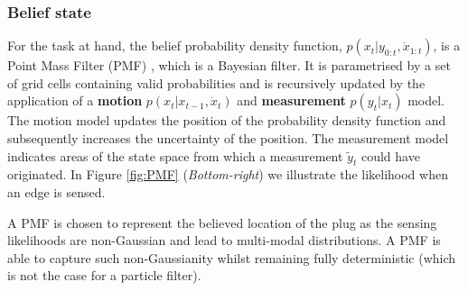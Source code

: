 \subsubsection{Belief state}
For the task at hand, the belief probability density function,  $p(x_t|y_{0:t},\dot{x}_{1:t})$,  
is a Point Mass Filter (PMF) \cite[p.87]{Bergman99recursivebayesian}, which is a  Bayesian filter.
It is parametrised by a set of grid cells containing valid probabilities 
and is recursively updated by the application of a \textbf{motion} $p(x_t|x_{t-1},\dot{x}_t)$ 
and \textbf{measurement} $p(y_t|x_t)$ model. The motion model updates the position of the probability density function 
and subsequently increases the uncertainty of the position.  The measurement model indicates areas 
of the state space from which a measurement $\tilde{y}_t$ could have originated. 
In Figure \ref{fig:PMF} (\textit{Bottom-right}) we illustrate the likelihood when an edge is sensed.

A PMF is chosen to represent the believed location of the plug as the sensing likelihoods are non-Gaussian and lead to multi-modal distributions.  
A PMF is able to capture such non-Gaussianity whilst remaining fully deterministic 
(which is not the case for a particle filter).


